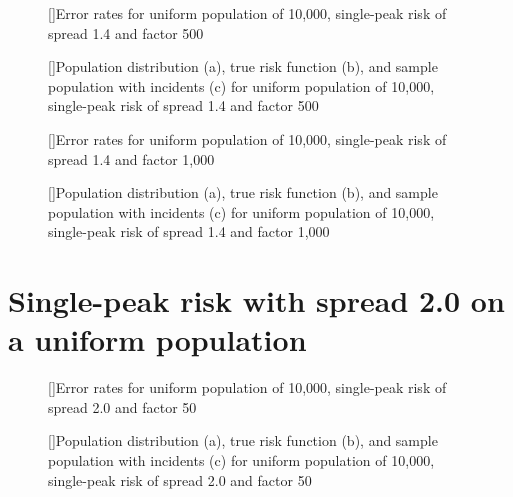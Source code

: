 {%

\begin{figure}[!htb]
    
    []{Error rates for uniform population of 10,000, single-peak risk of \gls{spread} 1.4 and \gls{factor} 500}
    \label{tab:mean_error_rates:unif_500_1.4_1h}
    
    []{Population distribution (a), true risk function (b), and sample population with incidents (c) for uniform population of 10,000, single-peak risk of \gls{spread} 1.4 and \gls{factor} 500}
    \label{fig:distributions:unif_500_1.4_1h}    
\end{figure}



\begin{figure}[!htb]
    
    []{Error rates for uniform population of 10,000, single-peak risk of \gls{spread} 1.4 and \gls{factor} 1,000}
    \label{tab:mean_error_rates:unif_1000_1.4_1h}
    
    []{Population distribution (a), true risk function (b), and sample population with incidents (c) for uniform population of 10,000, single-peak risk of \gls{spread} 1.4 and \gls{factor} 1,000}
    \label{fig:distributions:unif_1000_1.4_1h}    
\end{figure}

 
 
\section{Single-peak risk with spread 2.0 on a uniform population}
\label{sec:app:results_unif_2.0_1h}


\begin{figure}[!htb]
    
    []{Error rates for uniform population of 10,000, single-peak risk of \gls{spread} 2.0 and \gls{factor} 50}
    \label{tab:mean_error_rates:unif_50_2.0_1h}
    
    []{Population distribution (a), true risk function (b), and sample population with incidents (c) for uniform population of 10,000, single-peak risk of \gls{spread} 2.0 and \gls{factor} 50}
    \label{fig:distributions:unif_50_2.0_1h}    
\end{figure}


}
